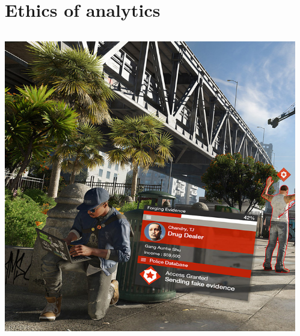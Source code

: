 \part{Ethics of analytics}
\frame{\partpage}

\begin{frame}
	\begin{columns}
		\begin{column}{0.48\textwidth}
			\includegraphics[width=\textwidth]{watch_dogs_2}
		\end{column}
		\pause
		\begin{column}{0.48\textwidth}

\end{column}
\end{columns}
\end{frame}
